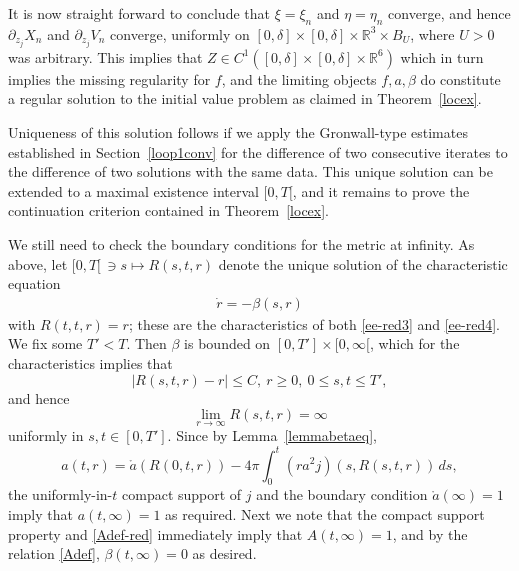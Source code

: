 \documentclass[11pt]{article}
\def\R{\mathbb R}
\begin{document}
It is now straight
forward to conclude that $\xi=\xi_n$ and $\eta=\eta_n$ converge, and hence
$\partial_{z_j} X_n$ and $\partial_{z_j} V_n$ converge, uniformly on
$[0,\delta]\times [0,\delta]\times \R^3 \times B_U$, where $U>0$ was arbitrary.
This implies that $Z\in C^1([0,\delta]\times [0,\delta]\times \R^6)$
which in turn implies the missing regularity for $f$,
and the limiting objects $f, a, \beta$
do constitute a regular solution to the initial value problem as claimed in
Theorem~\ref{locex}.

Uniqueness of this solution follows if we apply the Gronwall-type estimates
established in Section~\ref{loop1conv} for the
difference of two consecutive iterates  to the difference of two
solutions with the same data. This unique solution can be extended to a maximal
existence interval $[0,T[$, and it remains to prove the continuation
criterion contained in Theorem~\ref{locex}.

We still need to check the boundary conditions for the metric at infinity.
As above, let $[0,T[\,\ni s\mapsto R(s,t,r)$ denote the unique solution
of the characteristic equation
\begin{align}\label{charactbeta}
  \dot r = - \beta (s,r)
\end{align}
with $R(t,t,r)=r$; these are the characteristics of both
\eqref{ee-red3} and \eqref{ee-red4}. We fix some
$T'<T$. Then $\beta$ is bounded on $[0,T']\times [0,\infty[$,
which for the characteristics implies that
\[
|R(s,t,r)-r|\leq C,\ r\geq 0,\ 0\leq s,t\leq T',
\]
and hence
\[
\lim_{r\to\infty} R(s,t,r) = \infty
\]
uniformly in $s,t\in [0,T']$. Since by Lemma~\ref{lemmabetaeq},
\[
a(t,r)=\mathring{a}(R(0,t,r))
- 4\pi \int_0^t \left(r a^2 j\right)(s,R(s,t,r))\, ds,
\]
the uniformly-in-$t$ compact support of $j$ and the boundary condition
$\mathring{a}(\infty)=1$ imply that $a(t,\infty)=1$ as required.
Next we note that
the compact support property and \eqref{Adef-red}
immediately imply that $A(t,\infty)=1$,
and by the relation \eqref{Adef}, $\beta(t,\infty)=0$ as desired.
%    
%
\end{document}

